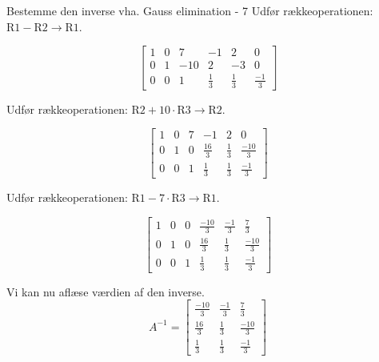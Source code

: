 \documentclass{article}
\begin{document}
\begin{exercise}{Bestemme den inverse vha. Gauss elimination - 7}
	\hint
	Udfør rækkeoperationen: $\text{R1} - \text{R2} \to \text{R1}$.
	
	\hint
	\[
	\left[\begin{array}{ccc|ccc}
	1 & 0 & 7 & -1 & 2 & 0 \\ 
	0 & 1 & -10 & 2 & -3 & 0 \\
	0 & 0 & 1 & \frac{1}{3} & \frac{1}{3} & \frac{-1}{3}
	\end{array} \right]
	\]
	
	\hint
	Udfør rækkeoperationen: $\text{R2} + 10 \cdot \text{R3}  \to \text{R2}$.
	
	\hint
	\[
	\left[\begin{array}{ccc|ccc}
	1 & 0 & 7 & -1 & 2 & 0 \\ 
	0 & 1 & 0 & \frac{16}{3} & \frac{1}{3} & \frac{-10}{3} \\
	0 & 0 & 1 & \frac{1}{3} & \frac{1}{3} & \frac{-1}{3}
	\end{array} \right]
	\]
	
	\hint
	Udfør rækkeoperationen: $\text{R1} - 7 \cdot \text{R3}  \to \text{R1}$.
	
	\hint
	\[
	\left[\begin{array}{ccc|ccc}
	1 & 0 & 0 & \frac{-10}{3} & \frac{-1}{3} & \frac{7}{3} \\ 
	0 & 1 & 0 & \frac{16}{3} & \frac{1}{3} & \frac{-10}{3} \\
	0 & 0 & 1 & \frac{1}{3} & \frac{1}{3} & \frac{-1}{3}
	\end{array} \right]
	\]
	
	\hint
	Vi kan nu aflæse værdien af den inverse.
	\[
	A^{-1} = \left[\begin{array}{ccc}
	\frac{-10}{3} & \frac{-1}{3} & \frac{7}{3} \\ 
	\frac{16}{3} & \frac{1}{3} & \frac{-10}{3} \\
	\frac{1}{3} & \frac{1}{3} & \frac{-1}{3}
	\end{array} \right]
	\]
	
	
\end{exercise}
\end{document}
